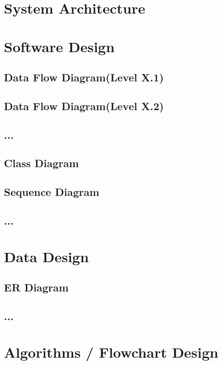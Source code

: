 \section{System Architecture}
\section{Software Design}


    \subsection{Data Flow Diagram(Level X.1)}
    \subsection{Data Flow Diagram(Level X.2)}
    \subsection{...}
    
    \subsection{Class Diagram}
    \subsection{Sequence Diagram}
    \subsection{...}

\section{Data Design}
    \subsection{ER Diagram}
    \subsection{...}

\section{Algorithms / Flowchart Design}
